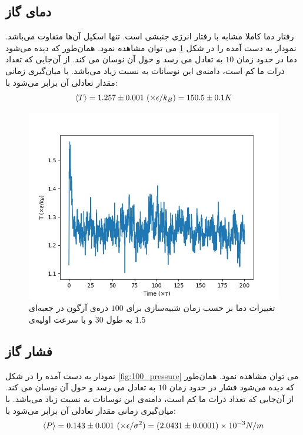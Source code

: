 \documentclass[11pt, a4paper]{article}
\begin{document}
\subsection{دمای گاز}
رفتار دما کاملا مشابه با رفتار انرژی جنبشی است. تنها اسکیل آن‌ها متفاوت می‌باشد.
نمودار به دست آمده را در شکل
\ref{fig:100_temperature}
می توان مشاهده نمود.
همان‌طور که دیده می‌شود دما در حدود زمان
$10$
به تعادل می رسد و حول آن نوسان می کند.
از آن‌جایی که تعداد ذرات ما کم است، دامنه‌ی این نوسانات به نسبت زیاد می‌باشد.
با میان‌گیری زمانی مقدار تعادلی آن برابر می‌شود با:
\begin{equation}
  \braket{T} = 1.257 \pm 0.001 \ (\times \epsilon / k_B) = 150.5 \pm 0.1 K
\end{equation}

\begin{figure}[h!]
	\centering
  \includegraphics[width=.7\textwidth]{MD_30_100_2_0.001_temperatures.jpg}
  \caption{تغییرات دما بر حسب زمان شبیه‌سازی برای $100$ ذره‌ی آرگون در جعبه‌ای به طول $30$ و با سرعت اولیه‌ی $1.5$}
  \label{fig:100_temperature}
\end{figure}


\subsection{فشار گاز}
نمودار به دست آمده را در شکل
\ref{fig:100_pressure}
می توان مشاهده نمود.
همان‌طور که دیده می‌شود فشار در حدود زمان
$10$
به تعادل می رسد و حول آن نوسان می کند.
از آن‌جایی که تعداد ذرات ما کم است، دامنه‌ی این نوسانات به نسبت زیاد می‌باشد.
با میان‌گیری زمانی مقدار تعادلی آن برابر می‌شود با:
\begin{equation}
  \braket{P} = 0.143 \pm 0.001 \ (\times \epsilon / \sigma^2) = (2.0431 \pm 0.0001) \times 10^{-3} N/m
\end{equation}
\end{document}
